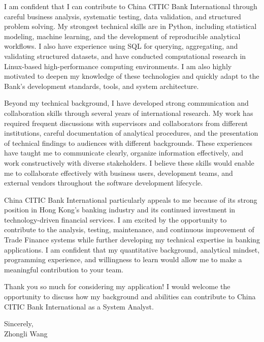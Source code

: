\documentclass[11pt]{article}
\begin{document}
I am confident that I can contribute to China CITIC Bank International through careful business analysis, systematic testing, data validation, and structured problem solving. My strongest technical skills are in Python, including statistical modeling, machine learning, and the development of reproducible analytical workflows. I also have experience using SQL for querying, aggregating, and validating structured datasets, and have conducted computational research in Linux-based high-performance computing environments. I am also highly motivated to deepen my knowledge of these technologies and quickly adapt to the Bank's development standards, tools, and system architecture.

Beyond my technical background, I have developed strong communication and collaboration skills through several years of international research. My work has required frequent discussions with supervisors and collaborators from different institutions, careful documentation of analytical procedures, and the presentation of technical findings to audiences with different backgrounds. These experiences have taught me to communicate clearly, organize information effectively, and work constructively with diverse stakeholders. I believe these skills would enable me to collaborate effectively with business users, development teams, and external vendors throughout the software development lifecycle.

China CITIC Bank International particularly appeals to me because of its strong position in Hong Kong's banking industry and its continued investment in technology-driven financial services. I am excited by the opportunity to contribute to the analysis, testing, maintenance, and continuous improvement of Trade Finance systems while further developing my technical expertise in banking applications. I am confident that my quantitative background, analytical mindset, programming experience, and willingness to learn would allow me to make a meaningful contribution to your team.

Thank you so much for considering my application! I would welcome the opportunity to discuss how my background and abilities can contribute to China CITIC Bank International as a System Analyst.

\vspace{0.15cm}

\noindent Sincerely, \\[0.5cm]

\noindent Zhongli Wang
\end{document}
